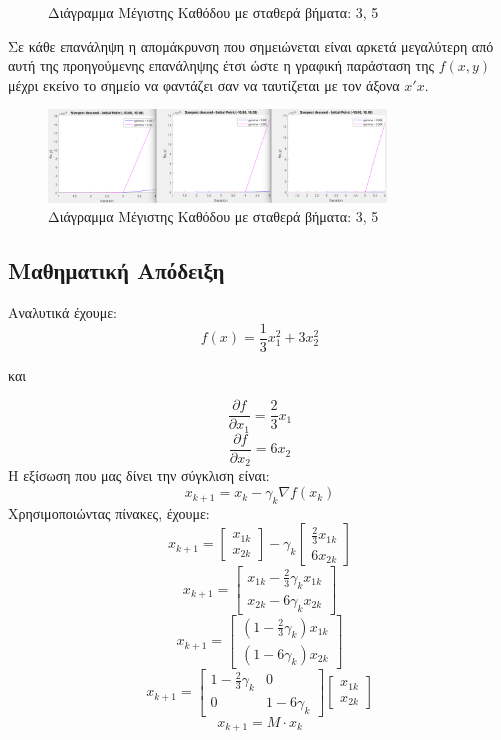 \documentclass{report}
\begin{document}
\begin{itemize}
\begin{figure}[H]
        \caption{Διάγραμμα Μέγιστης Καθόδου με σταθερά βήματα: 3, 5}
    \end{figure}
    Σε κάθε επανάληψη η απομάκρυνση που σημειώνεται είναι αρκετά μεγαλύτερη από αυτή της
    προηγούμενης επανάληψης έτσι ώστε η γραφική παράσταση της $f(x,y)$ μέχρι εκείνο το 
    σημείο να φαντάζει σαν να ταυτίζεται με τον άξονα $x'x$. 
    \begin{figure}[H]
        \centering
        \includegraphics[width=0.8\textwidth]{media/thema1-2-2.png}
        \caption{Διάγραμμα Μέγιστης Καθόδου με σταθερά βήματα: 3, 5}
    \end{figure}
\end{itemize}

\subsection{Μαθηματική Απόδειξη}
Αναλυτικά έχουμε:
$$f(x) = \frac{1}{3} x_1^2 + 3x_2^2$$
\begin{center}
    και
\end{center}
$$\frac{\partial f}{\partial x_1} = \frac{2}{3}x_1$$
$$\frac{\partial f}{\partial x_2} = 6x_2$$
Η εξίσωση που μας δίνει την σύγκλιση είναι:
$$x_{k+1} = x_k - \gamma_k \nabla f(x_k)$$
Χρησιμοποιώντας πίνακες, έχουμε:
$$x_{k+1} = \begin{bmatrix} x_{1k} \\ x_{2k} \end{bmatrix} - \gamma_k \begin{bmatrix} \frac{2}{3}x_{1k} \\ 6x_{2k} \end{bmatrix}$$
$$x_{k+1} = \begin{bmatrix} x_{1k} - \frac{2}{3}\gamma_k x_{1k} \\ x_{2k} - 6\gamma_k x_{2k} \end{bmatrix}$$
$$x_{k+1} = \begin{bmatrix} (1 - \frac{2}{3}\gamma_k)x_{1k} \\ (1 - 6\gamma_k)x_{2k} \end{bmatrix}$$
$$x_{k+1} = \begin{bmatrix} 1 - \frac{2}{3}\gamma_k & 0 \\ 0 & 1 - 6\gamma_k \end{bmatrix} \begin{bmatrix} x_{1k} \\ x_{2k} \end{bmatrix}$$
$$x_{k+1} = M \cdot x_k$$
\end{document}
